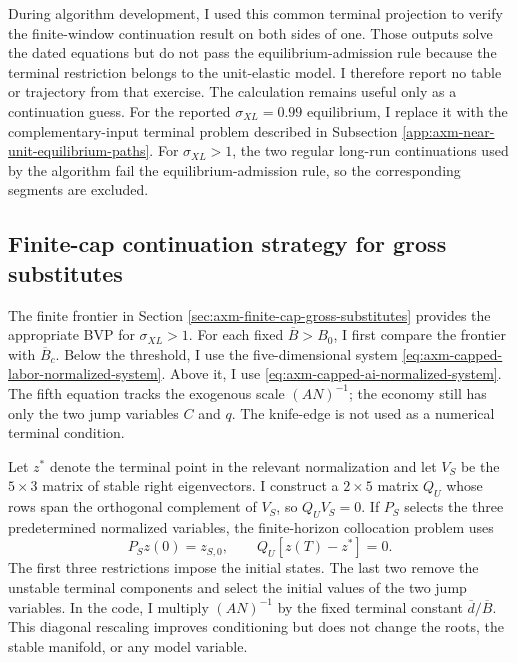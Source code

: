 During algorithm development, I used this common terminal projection to verify
the finite-window continuation result on both sides of one. Those outputs solve
the dated equations but do not pass the equilibrium-admission rule because the
terminal restriction belongs to the unit-elastic model. I therefore report no
table or trajectory from that exercise. The calculation remains useful only as
a continuation guess. For the reported \(\sigma_{XL}=0.99\) equilibrium, I
replace it with the complementary-input terminal problem described in
Subsection \ref{app:axm-near-unit-equilibrium-paths}. For
\(\sigma_{XL}>1\), the two regular long-run continuations used by the algorithm
fail the equilibrium-admission rule, so the corresponding segments are
excluded.

\subsection{Finite-cap continuation strategy for gross substitutes}
\label{app:axm-finite-cap-algorithm}

The finite frontier in Section
\ref{sec:axm-finite-cap-gross-substitutes} provides the appropriate BVP for
\(\sigma_{XL}>1\). For each fixed \(\overline B>B_0\), I first compare the
frontier with \(\overline B_c\). Below the threshold, I use the five-dimensional
system \eqref{eq:axm-capped-labor-normalized-system}. Above it, I use
\eqref{eq:axm-capped-ai-normalized-system}. The fifth equation tracks the
exogenous scale \((AN)^{-1}\); the economy still has only the two jump variables
\(C\) and \(q\). The knife-edge is not used as a numerical terminal condition.

Let \(z^*\) denote the terminal point in the relevant normalization and let
\(V_S\) be the \(5\times3\) matrix of stable right eigenvectors. I construct a
\(2\times5\) matrix \(Q_U\) whose rows span the orthogonal complement of
\(V_S\), so \(Q_UV_S=0\). If \(P_S\) selects the three predetermined
normalized variables, the finite-horizon collocation problem uses
\begin{equation}
 P_Sz(0)=z_{S,0},
 \qquad
 Q_U[z(T)-z^*]=0.
 \label{eq:axm-capped-bvp-boundary-conditions}
\end{equation}
The first three restrictions impose the initial states. The last two remove
the unstable terminal components and select the initial values of the two jump
variables. In the code, I multiply \((AN)^{-1}\) by the fixed terminal constant
\(\overline d/\overline B\). This diagonal rescaling improves conditioning but
does not change the roots, the stable manifold, or any model variable.

